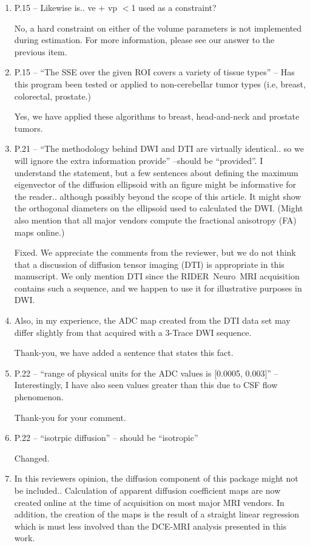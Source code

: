 \documentclass[11pt]{article}
\begin{document}
\begin{enumerate}
\item P.15 – Likewise is.. ve + vp $<$1 used as a constraint?

  No, a hard constraint on either of the volume parameters is not
  implemented during estimation.  For more information, please see our
  answer to the previous item.

\item P.15 – ``The SSE over the given ROI covers a variety of tissue
  types'' – Has this program been tested or applied to non-cerebellar
  tumor types (i.e, breast, colorectal, prostate.)

  Yes, we have applied these algorithms to breast, head-and-neck and
  prostate tumors.

\item P.21 – ``The methodology behind DWI and DTI are virtually
  identical.. so we will ignore the extra information provide''
  –should be ``provided''.  I understand the statement, but a few
  sentences about defining the maximum eigenvector of the diffusion
  ellipsoid with an figure might be informative for the
  reader.. although possibly beyond the scope of this article. It
  might show the orthogonal diameters on the ellipsoid used to
  calculated the DWI. (Might also mention that all major vendors
  compute the fractional anisotropy (FA) maps online.)

  Fixed.  We appreciate the comments from the reviewer, but we do not
  think that a discussion of diffusion tensor imaging (DTI) is
  appropriate in this manuscript.  We only mention DTI since the
  RIDER~Neuro~MRI acquisition contains such a sequence, and we happen
  to use it for illustrative purposes in DWI.

\item Also, in my experience, the ADC map created from the DTI data
  set may differ slightly from that acquired with a 3-Trace DWI
  sequence.

  Thank-you, we have added a sentence that states this fact.

\item P.22 – ``range of physical units for the ADC values is [0.0005,
  0.003]'' – Interestingly, I have also seen values greater than this
  due to CSF flow phenomenon.

  Thank-you for your comment.

\item P.22 – ``isotrpic diffusion'' – should be ``isotropic''

  Changed.

\item In this reviewers opinion, the diffusion component of this
  package might not be included..  Calculation of apparent diffusion
  coefficient maps are now created online at the time of acquisition
  on most major MRI vendors.  In addition, the creation of the maps is
  the result of a straight linear regression which is must less
  involved than the DCE-MRI analysis presented in this work.


\end{enumerate}
\end{document}
